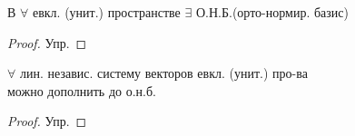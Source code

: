 \documentclass[../main.tex]{subfiles}
\begin{document}
	\begin{corollary}
		В $\forall$ евкл. (унит.) пространстве $\exists$ О.Н.Б.(орто-нормир. базис)
	\end{corollary}
	\begin{proof}
		Упр.
	\end{proof}
	\begin{corollary}
		$\forall$ лин. независ. систему векторов евкл. (унит.) про-ва\\
		можно дополнить до о.н.б.
	\end{corollary}
	\begin{proof}
		Упр.
	\end{proof}
\end{document}
